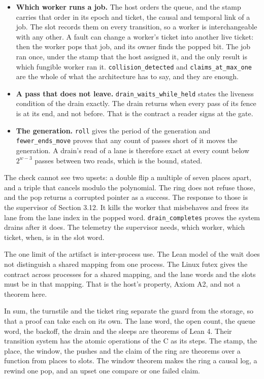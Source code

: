 \begin{itemize}
\item \textbf{Which worker runs a job.} The host orders the queue, and the stamp carries that order in its epoch and ticket, the causal and temporal link of a job. The slot records them on every transition, so a worker is interchangeable with any other. A fault can change a worker's ticket into another live ticket: then the worker pops that job, and its owner finds the popped bit. The job ran once, under the stamp that the host assigned it, and the only result is which fungible worker ran it. \texttt{collision\_\allowbreak{}detected} and \texttt{claims\_\allowbreak{}at\_\allowbreak{}max\_\allowbreak{}one} are the whole of what the architecture has to say, and they are enough.
\item \textbf{A pass that does not leave.} \texttt{drain\_\allowbreak{}waits\_\allowbreak{}while\_\allowbreak{}held} states the liveness condition of the drain exactly. The drain returns when every pass of its fence is at its end, and not before. That is the contract a reader signs at the gate.
\item \textbf{The generation.} \texttt{roll} gives the period of the generation and \texttt{fewer\_\allowbreak{}ends\_\allowbreak{}move} proves that any count of passes short of it moves the generation. A drain's read of a lane is therefore exact at every count below \(2^{w-3}\) passes between two reads, which is the bound, stated.
\end{itemize}

The check cannot see two upsets: a double flip a multiple of seven places apart, and a triple that cancels modulo the polynomial. The ring does not refuse those, and the pop returns a corrupted pointer as a success. The response to those is the supervisor of Section 3.12. It kills the worker that misbehaves and frees its lane from the lane index in the popped word. \texttt{drain\_\allowbreak{}completes} proves the system drains after it does. The telemetry the supervisor needs, which worker, which ticket, when, is in the slot word.

The one limit of the artifact is inter-process use. The Lean model of the wait does not distinguish a shared mapping from one process. The Linux futex gives the contract across processes for a shared mapping, and the lane words and the slots must be in that mapping. That is the host's property, Axiom A2, and not a theorem here.

In sum, the turnstile and the ticket ring separate the guard from the storage, so that a proof can take each on its own. The lane word, the open count, the queue word, the backoff, the drain and the sleeps are theorems of Lean 4. Their transition system has the atomic operations of the C as its steps. The stamp, the place, the window, the pushes and the claim of the ring are theorems over a function from places to slots. The window theorem makes the ring a causal log, a rewind one pop, and an upset one compare or one failed claim.

